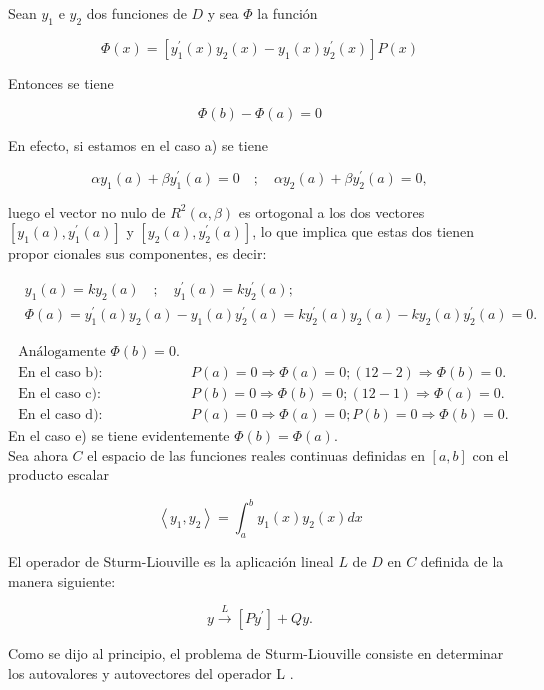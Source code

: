 \documentclass[10pt]{article}
\theoremstyle{plain}
\theoremstyle{definition}
\theoremstyle{remark}
\begin{document}
Sean $y_{1}$ e $y_{2}$ dos funciones de $D$ y sea $\Phi$ la función

$$
\Phi(x)=\left[y_{1}^{\prime}(x) y_{2}(x)-y_{1}(x) y_{2}^{\prime}(x)\right] P(x)
$$

Entonces se tiene


\begin{equation*}
\Phi(b)-\Phi(a)=0 \tag{12-4}
\end{equation*}


En efecto, si estamos en el caso a) se tiene

$$
\alpha y_{1}(a)+\beta y_{1}^{\prime}(a)=0 \quad ; \quad \alpha y_{2}(a)+\beta y_{2}^{\prime}(a)=0,
$$

luego el vector no nulo de $R^{2}(\alpha, \beta)$ es ortogonal a los dos vectores $\left[y_{1}(a), y_{1}^{\prime}(a)\right]$ y $\left[y_{2}(a), y_{2}^{\prime}(a)\right]$, lo que implica que estas dos tienen propor cionales sus componentes, es decir:

$$
\begin{aligned}
& y_{1}(a)=k y_{2}(a) \quad ; \quad y_{1}^{\prime}(a)=k y_{2}^{\prime}(a) ; \\
& \Phi(a)=y_{1}^{\prime}(a) y_{2}(a)-y_{1}(a) y_{2}^{\prime}(a)=k y_{2}^{\prime}(a) y_{2}(a)-k y_{2}(a) y_{2}^{\prime}(a)=0 .
\end{aligned}
$$

$\begin{array}{ll}\text { Análogamente } \Phi(b)=0 . \\ \text { En el caso b): } & P(a)=0 \Rightarrow \Phi(a)=0 ;(12-2) \Rightarrow \Phi(b)=0 . \\ \text { En el caso c): } & P(b)=0 \Rightarrow \Phi(b)=0 ;(12-1) \Rightarrow \Phi(a)=0 . \\ \text { En el caso d): } & P(a)=0 \Rightarrow \Phi(a)=0 ; P(b)=0 \Rightarrow \Phi(b)=0 .\end{array}$\\
En el caso e) se tiene evidentemente $\Phi(b)=\Phi(a)$.\\
Sea ahora $C$ el espacio de las funciones reales continuas definidas en $[a, b]$ con el producto escalar


$$
\left\langle y_{1}, y_{2}\right\rangle=\int_{a}^{b} y_{1}(x) y_{2}(x) d x
$$

El operador de Sturm-Liouville es la aplicación lineal $L$ de $D$ en $C$ definida de la manera siguiente:

$$
y \xrightarrow{L}\left[P y^{\prime}\right]+Q y .
$$

Como se dijo al principio, el problema de Sturm-Liouville consiste en determinar los autovalores y autovectores del operador L .
\end{document}
